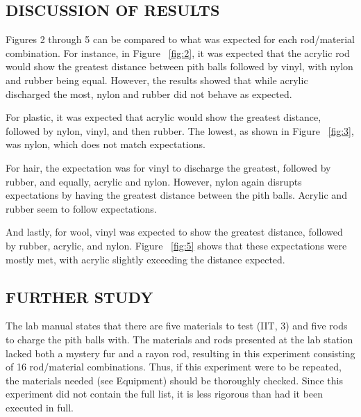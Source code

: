 \documentclass [12pt, letterpaper, twoside] {article}
\begin{document}
\begin {figure}
  \centering
  \caption {}
  \label{fig:7}
\end {figure}

\subsection* {DISCUSSION OF RESULTS}
Figures 2 through 5 can be compared to what was expected for each rod/material combination. For instance, in Figure ~\ref{fig:2}, it was expected that the acrylic rod would show the greatest distance between pith balls followed by vinyl, with nylon and rubber being equal. However, the results showed that while acrylic discharged the most, nylon and rubber did not behave as expected.

For plastic, it was expected that acrylic would show the greatest distance, followed by nylon, vinyl, and then rubber. The lowest, as shown in Figure ~\ref{fig:3}, was nylon, which does not match expectations.

For hair, the expectation was for vinyl to discharge the greatest, followed by rubber, and equally, acrylic and nylon. However, nylon again disrupts expectations by having the greatest distance between the pith balls. Acrylic and rubber seem to follow expectations.

And lastly, for wool, vinyl was expected to show the greatest distance, followed by rubber, acrylic, and nylon. Figure ~\ref{fig:5} shows that these expectations were mostly met, with acrylic slightly exceeding the distance expected.

\subsection* {FURTHER STUDY}
The lab manual states that there are five materials to test (IIT, 3) and five rods to charge the pith balls with. The materials and rods presented at the lab station lacked both a mystery fur and a rayon rod, resulting in this experiment consisting of 16 rod/material combinations. Thus, if this experiment were to be repeated, the materials needed (see Equipment) should be thoroughly checked. Since this experiment did not contain the full list, it is less rigorous than had it been executed in full.
\end{document}
